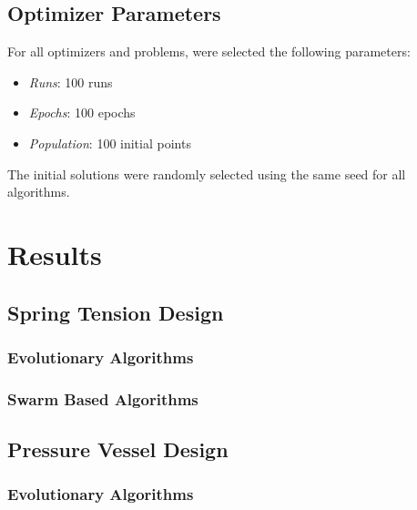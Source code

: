 \documentclass[conference]{IEEEtran}
\begin{document}
\subsection{Optimizer Parameters}
\label{subsec:methodology-optimizer-parameters}

For all optimizers and problems, were selected the following parameters:

\begin{itemize}
    \item \textit{Runs}: 100 runs
    \item \textit{Epochs}: 100 epochs
    \item \textit{Population}: 100 initial points
\end{itemize}

The initial solutions were randomly selected using the same seed for all algorithms.

\section{Results}
\label{sec:results}\subsection{Spring Tension Design}

\label{ssubec:spring_problem}\subsubsection{Evolutionary Algorithms}

\label{subsubsec:spring_problem_evolutionary_based}

\subsubsection{Swarm Based Algorithms}

\label{subsubsec:spring_problem_swarm_based}

\subsection{Pressure Vessel Design}

\label{subsec:pressure_vessel_problem}\subsubsection{Evolutionary Algorithms}

\label{subsubsec:pressure_vessel_problem_evolutionary_based}
\end{document}
